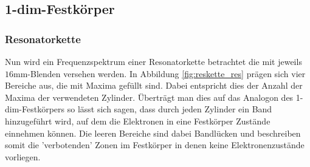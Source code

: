 \subsection{1-dim-Festkörper}
\subsubsection*{Resonatorkette}
Nun wird ein Frequenzspektrum einer Resonatorkette betrachtet die mit jeweils $16$mm-Blenden versehen werden.
In Abbildung \ref{fig:reskette_res} prägen sich vier Bereiche aus, die mit Maxima gefüllt sind. Dabei entspricht dies der Anzahl der Maxima der verwendeten Zylinder.
Überträgt man dies auf das Analogon des 1-dim-Festkörpers so lässt sich sagen, dass durch jeden Zylinder ein Band hinzugeführt wird, auf dem die Elektronen
in eine Festkörper Zustände einnehmen können. Die leeren Bereiche sind dabei Bandlücken und beschreiben somit die 'verbotenden' Zonen im Festkörper in denen keine Elektronenzustände vorliegen.


